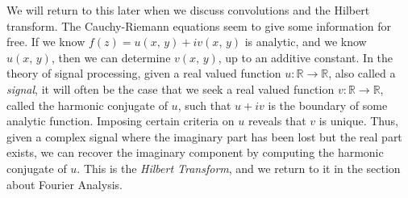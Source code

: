     We will return to this later when we discuss convolutions and the
    Hilbert transform. The Cauchy-Riemann equations seem to give some
    information for free. If we know $f(z)=u(x,\,y)+iv(x,\,y)$ is
    analytic, and we know $u(x,\,y)$, then we can determine $v(x,\,y)$, up
    to an additive constant. In the theory of signal processing, given a
    real valued function $u:\mathbb{R}\rightarrow\mathbb{R}$, also called
    a \textit{signal}, it will often be the case that we seek a real
    valued function $v:\mathbb{R}\rightarrow\mathbb{R}$, called the
    harmonic conjugate of $u$, such that $u+iv$ is the boundary of some
    analytic function. Imposing certain criteria on $u$ reveals that $v$
    is unique. Thus, given a complex signal where the imaginary part has
    been lost but the real part exists, we can recover the imaginary
    component by computing the harmonic conjugate of $u$. This is the
    \textit{Hilbert Transform}, and we return to it in the section about
    Fourier Analysis.
